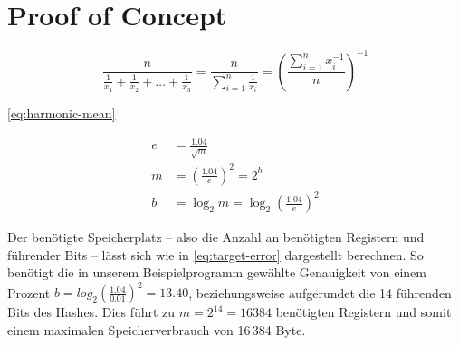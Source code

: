 \section{Proof of Concept}



\begin{equation}
	\frac{n}{\frac{1}{x_1}+\frac{1}{x_2}+\ldots+\frac{1}{x_3}}=\frac{n}{\displaystyle\sum_{i=1}^{n}\frac{1}{x_i}}=\left(\frac{\displaystyle\sum_{i=1}^{n}x_i^{-1}}{n}\right)^{-1}
	\label{eq:harmonic-mean}
\end{equation}

\autoref{eq:harmonic-mean}



\begin{equation}
	\begin{aligned}
		e& = \frac{1.04}{\sqrt{m}} \\
		m& = \left(\frac{1.04}{e}\right)^2 = 2^b \\
		b& = \log_2 m = \log_2 \left(\frac{1.04}{e}\right)^2
	\end{aligned}
	\label{eq:target-error}
\end{equation}

Der benötigte Speicherplatz -- also die Anzahl an benötigten Registern und führender Bits -- lässt sich wie in \autoref{eq:target-error} dargestellt berechnen. So benötigt die in unserem Beispielprogramm gewählte Genauigkeit von einem Prozent $b = log_2 \left(\frac{1.04}{0.01}\right)^2 = 13.40$, beziehungsweise aufgerundet die 14 führenden Bits des Hashes. Dies führt zu $m = 2^{14} = 16384$ benötigten Registern und somit einem maximalen Speicherverbrauch von 16\,384 Byte.